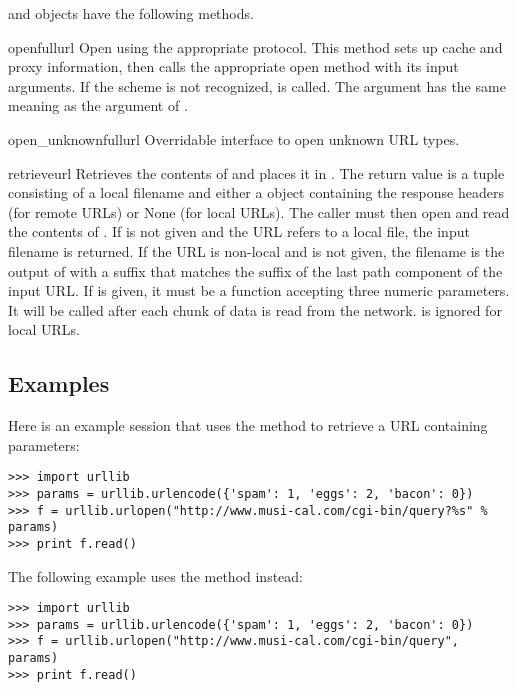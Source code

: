  and  objects have the
following methods.

\begin{methoddesc}{open}{fullurl}
Open  using the appropriate protocol.  This method sets 
up cache and proxy information, then calls the appropriate open method with
its input arguments.  If the scheme is not recognized,
 is called.  The  argument 
has the same meaning as the  argument of .
\end{methoddesc}

\begin{methoddesc}{open_unknown}{fullurl}
Overridable interface to open unknown URL types.
\end{methoddesc}

\begin{methoddesc}{retrieve}{url}
Retrieves the contents of  and places it in .  The
return value is a tuple consisting of a local filename and either a
 object containing the response headers (for remote
URLs) or None (for local URLs).  The caller must then open and read the
contents of .  If  is not given and the URL
refers to a local file, the input filename is returned.  If the URL is
non-local and  is not given, the filename is the output of
 with a suffix that matches the suffix of the last
path component of the input URL.  If  is given, it must be
a function accepting three numeric parameters.  It will be called after each
chunk of data is read from the network.   is ignored for
local URLs.
\end{methoddesc}


\subsection{Examples}

Here is an example session that uses the  method to retrieve
a URL containing parameters:

\begin{verbatim}
>>> import urllib
>>> params = urllib.urlencode({'spam': 1, 'eggs': 2, 'bacon': 0})
>>> f = urllib.urlopen("http://www.musi-cal.com/cgi-bin/query?%s" % params)
>>> print f.read()
\end{verbatim}

The following example uses the  method instead:

\begin{verbatim}
>>> import urllib
>>> params = urllib.urlencode({'spam': 1, 'eggs': 2, 'bacon': 0})
>>> f = urllib.urlopen("http://www.musi-cal.com/cgi-bin/query", params)
>>> print f.read()
\end{verbatim}

